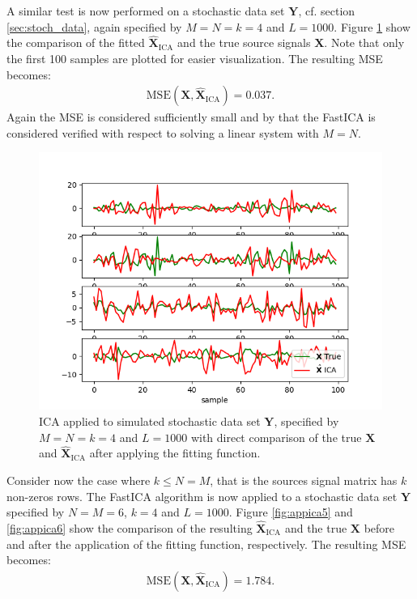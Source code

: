 \noindent
A similar test is now performed on a stochastic data set $\mathbf{Y}$, cf. section \ref{sec:stoch_data}, again specified by $M = N = k = 4$ and $L = 1000$. 
Figure \ref{fig:appica3} show the comparison of the fitted $\hat{\mathbf{X}}_{\text{ICA}}$ and the true source signals $\mathbf{X}$. 
Note that only the first 100 samples are plotted for easier visualization. The resulting MSE becomes:
\begin{align*}
\text{MSE}(\mathbf{X}, \hat{\mathbf{X}}_{\text{ICA}}) = 0.037.
\end{align*}       
Again the MSE is considered sufficiently small and by that the FastICA is considered verified with respect to solving a linear system with $M = N$. 
\begin{figure}[H]
	\centering
	\includegraphics[scale=0.5]{figures/ICAapp/ICA_app3.png}
	\caption{ICA applied to simulated stochastic data set $\mathbf{Y}$, specified by $M = N = k = 4$ and $L = 1000$ with direct comparison of the true $\mathbf{X}$ and $\hat{\mathbf{X}}_{\text{ICA}}$ after applying the fitting function.}
	\label{fig:appica3}
\end{figure}
\noindent
Consider now the case where $k \leq N = M$, that is the sources signal matrix has $k$ non-zeros rows. 
The FastICA algorithm is now applied to a stochastic data set $\mathbf{Y} $ specified by $N = M = 6$, $k = 4$ and $L = 1000$. 
Figure \ref{fig:appica5} and \ref{fig:appica6} show the comparison of the resulting $\hat{\mathbf{X}}_{\text{ICA}}$ and the true $\mathbf{X}$ before and after the application of the fitting function, respectively. The resulting MSE becomes:
\begin{align*}
\text{MSE}(\mathbf{X}, \hat{\mathbf{X}}_{\text{ICA}}) = 1.784.
\end{align*} 
